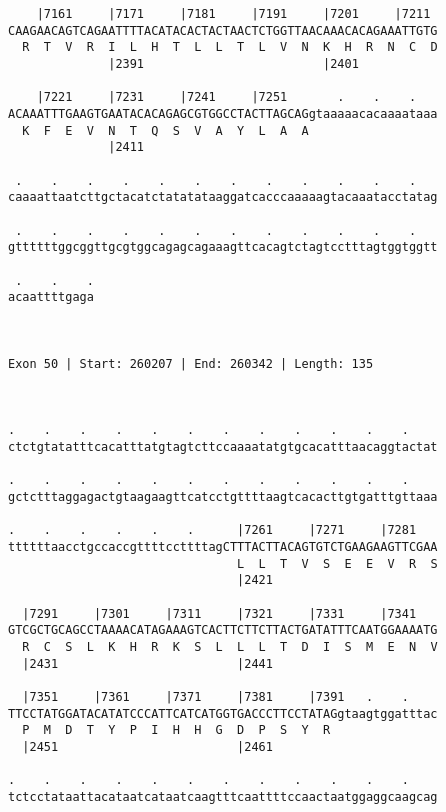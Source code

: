 \documentclass{article}
\begin{document}
\begin{Verbatim}
    |7161     |7171     |7181     |7191     |7201     |7211 
CAAGAACAGTCAGAATTTTACATACACTACTAACTCTGGTTAACAAACACAGAAATTGTG
  R  T  V  R  I  L  H  T  L  L  T  L  V  N  K  H  R  N  C  D
              |2391                         |2401           
  
    |7221     |7231     |7241     |7251       .    .    .   
ACAAATTTGAAGTGAATACACAGAGCGTGGCCTACTTAGCAGgtaaaaacacaaaataaa
  K  F  E  V  N  T  Q  S  V  A  Y  L  A  A                  
              |2411                                         
  
 .    .    .    .    .    .    .    .    .    .    .    .   
caaaattaatcttgctacatctatatataaggatcacccaaaaagtacaaatacctatag
                                                            
 .    .    .    .    .    .    .    .    .    .    .    .   
gttttttggcggttgcgtggcagagcagaaagttcacagtctagtcctttagtggtggtt
                                                            
 .    .    .
acaattttgaga
            
            
 
Exon 50 | Start: 260207 | End: 260342 | Length: 135



.    .    .    .    .    .    .    .    .    .    .    .    
ctctgtatatttcacatttatgtagtcttccaaaatatgtgcacatttaacaggtactat
                                                            
.    .    .    .    .    .    .    .    .    .    .    .    
gctctttaggagactgtaagaagttcatcctgttttaagtcacacttgtgatttgttaaa
                                                            
.    .    .    .    .    .      |7261     |7271     |7281   
ttttttaacctgccaccgttttccttttagCTTTACTTACAGTGTCTGAAGAAGTTCGAA
                                L  L  T  V  S  E  E  V  R  S
                                |2421                       
  
  |7291     |7301     |7311     |7321     |7331     |7341   
GTCGCTGCAGCCTAAAACATAGAAAGTCACTTCTTCTTACTGATATTTCAATGGAAAATG
  R  C  S  L  K  H  R  K  S  L  L  L  T  D  I  S  M  E  N  V
  |2431                         |2441                       
  
  |7351     |7361     |7371     |7381     |7391   .    .    
TTCCTATGGATACATATCCCATTCATCATGGTGACCCTTCCTATAGgtaagtggatttac
  P  M  D  T  Y  P  I  H  H  G  D  P  S  Y  R               
  |2451                         |2461                       
  
.    .    .    .    .    .    .    .    .    .    .    .    
tctcctataattacataatcataatcaagtttcaattttccaactaatggaggcaagcag
                                                            

\end{Verbatim}
\end{document}
